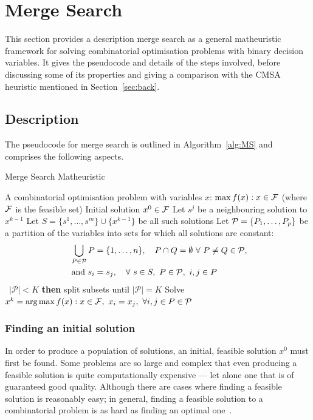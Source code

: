 \documentclass[journal]{IEEEtran}
\begin{document}
\section{Merge Search}\label{sec:merge}

This section provides a description merge search as a general matheuristic framework for solving combinatorial optimisation problems with binary decision variables. It gives the pseudocode and details of the steps involved, before discussing some of its properties and giving a comparison with the CMSA heuristic mentioned in Section~\ref{sec:back}.

\subsection{Description}
The pseudocode for merge search is outlined in Algorithm~\ref{alg:MS} and comprises the following aspects.

\begin{algorithm}[htb!]
\caption{{\sf Merge Search Matheuristic}} \label{alg:MS}
\begin{algorithmic}[1]
{\footnotesize
  \Require A combinatorial optimisation problem with variables $x$: $\max f(x) : x\in {\cal F}$ (where ${\cal F}$ is the feasible set)
  \Require Initial solution $x^0\in \cal F$
    \State Let $s^j$ be a neighbouring solution to $x^{k-1}$
    \label{step:nbhd}
      \EndFor
    \State Let  $S=\{s^1,\ldots,s^m\}\cup\{x^{k-1}\}$ be all such solutions
    \State Let ${\cal P}=\{P_1,\ldots,P_p\}$ be a partition of the variables into sets for which all solutions are constant:\label{step:P}
    \begin{align*}
      \bigcup_{P\in {\cal P}} P&=\{1,\ldots,n\},\quad P \cap Q=\emptyset\ \forall\ P\ne Q\in  {\cal P},\\
      \text{ and } s_i &= s_j, \quad \forall\ s\in S,\ P\in {\cal P},\ i,j\in P
    \end{align*}
   \ {$|\mathcal{P}| < K$} {\bf then} split subsets until $|\mathcal{P}|=K$ \label{step:RandSplit}
  \State Solve $x^k=\text{arg}\max f(x) : x\in {\cal F},\ x_i=x_j,\ \forall
  i,j\in P\in{\cal P}$\label{step:merge}
\EndFor
}
\end{algorithmic}
\end{algorithm}

\subsubsection*{\bf Finding an initial solution}
In order to produce a population of solutions, an initial, feasible solution $x^0$ must first be found. Some problems are so large and complex that even producing a feasible solution is quite computationally expensive --- let alone one that is of guaranteed good quality. Although there are cases where finding a feasible solution is reasonably easy; in general, finding a feasible solution to a combinatorial problem is as hard as finding an optimal one~\cite{copalg}.
\end{document}
